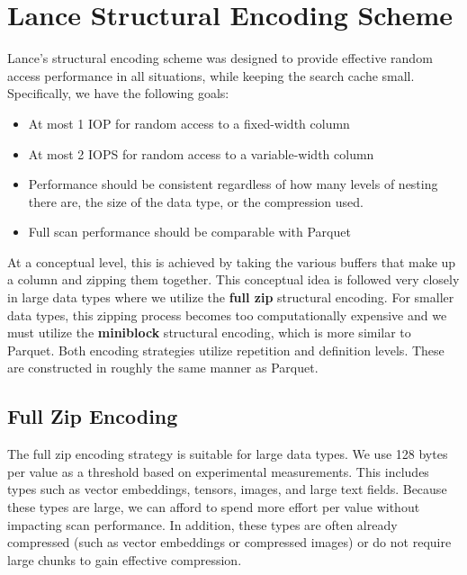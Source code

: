 \documentclass[sigconf, nonacm]{acmart}
\begin{document}
\section{Lance Structural Encoding Scheme} \label{lance-structural}

Lance's structural encoding scheme was designed to provide effective random access performance in all situations, while keeping the search cache small.  Specifically, we have the following goals:

\begin{itemize}
    \item At most 1 IOP for random access to a fixed-width column
    \item At most 2 IOPS for random access to a variable-width column
    \item Performance should be consistent regardless of how many levels of nesting there are, the size of the data type, or the compression used.
    \item Full scan performance should be comparable with Parquet
\end{itemize}

At a conceptual level, this is achieved by taking the various buffers that make up a column and zipping them together.  This conceptual idea is followed very closely in large data types where we utilize the \textbf{full zip} structural encoding.  For smaller data types, this zipping process becomes too computationally expensive and we must utilize the \textbf{miniblock} structural encoding, which is more similar to Parquet.  Both encoding strategies utilize repetition and definition levels.  These are constructed in roughly the same manner as Parquet.

\subsection{Full Zip Encoding}

The full zip encoding strategy is suitable for large data types.  We use 128 bytes per value as a threshold based on experimental measurements.  This includes types such as vector embeddings, tensors, images, and large text fields.  Because these types are large, we can afford to spend more effort per value without impacting scan performance.  In addition, these types are often already compressed (such as vector embeddings or compressed images) or do not require large chunks to gain effective compression.
\end{document}
